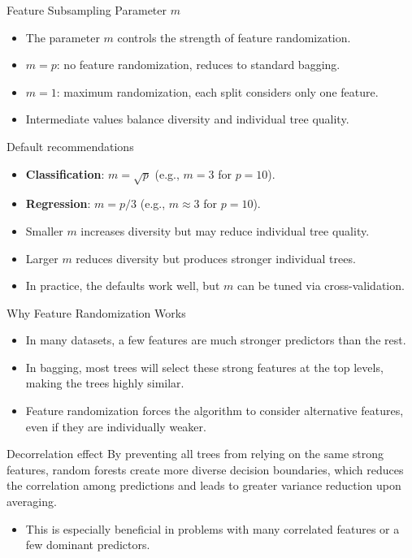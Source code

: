 \begin{frame}{Feature Subsampling Parameter $m$}
  \begin{itemize}
    \item The parameter $m$ controls the strength of feature randomization.
    \item \alert{$m = p$}: no feature randomization, reduces to standard bagging.
    \item \alert{$m = 1$}: maximum randomization, each split considers only one feature.
    \item Intermediate values balance diversity and individual tree quality.
  \end{itemize}
  \begin{block}{Default recommendations}
    \begin{itemize}
      \item \textbf{Classification}: $m = \sqrt{p}$ (e.g., $m = 3$ for $p = 10$).
      \item \textbf{Regression}: $m = p/3$ (e.g., $m \approx 3$ for $p = 10$).
    \end{itemize}
  \end{block}
  \begin{itemize}
    \item Smaller $m$ increases diversity but may reduce individual tree quality.
    \item Larger $m$ reduces diversity but produces stronger individual trees.
    \item In practice, the defaults work well, but $m$ can be tuned via cross-validation.
  \end{itemize}
\end{frame}

\begin{frame}{Why Feature Randomization Works}
  \begin{itemize}
    \item In many datasets, a \alert{few features are much stronger predictors} than the rest.
    \item In bagging, most trees will select these strong features at the top levels,
          making the trees highly similar.
    \item Feature randomization forces the algorithm to consider \alert{alternative features},
          even if they are individually weaker.
  \end{itemize}
  \begin{block}{Decorrelation effect}
    By preventing all trees from relying on the same strong features, random forests create
    more \alert{diverse decision boundaries}, which reduces the correlation among predictions
    and leads to greater variance reduction upon averaging.
  \end{block}
  \begin{itemize}
    \item This is especially beneficial in problems with many correlated features or a few
          dominant predictors.
  \end{itemize}
\end{frame}

